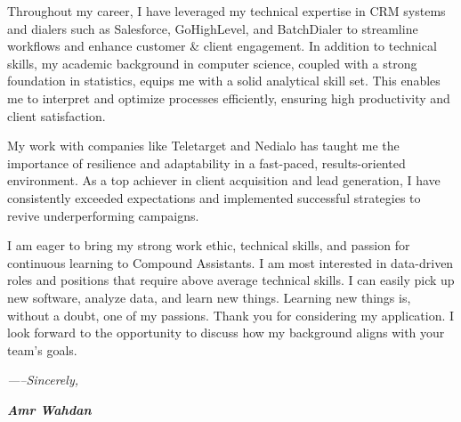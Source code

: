 \documentclass[12pt]{article}
\newcommand{\fancy}[1]{\Large\textbf{\textit{#1}}}
\begin{document}
\vspace{1em}

Throughout my career, I have leveraged my technical expertise in CRM systems and dialers such as Salesforce, GoHighLevel, and BatchDialer to streamline workflows and enhance customer \& client engagement. In addition to technical skills, my academic background in computer science, coupled with a strong foundation in statistics, equips me with a solid analytical skill set. This enables me to interpret and optimize processes efficiently, ensuring high productivity and client satisfaction. \par

\vspace{1em}

My work with companies like Teletarget and Nedialo has taught me the importance of resilience and adaptability in a fast-paced, results-oriented environment. As a top achiever in client acquisition and lead generation, I have consistently exceeded expectations and implemented successful strategies to revive underperforming campaigns. \par

\vspace{1em}

I am eager to bring my strong work ethic, technical skills, and passion for continuous learning to Compound Assistants. I am most interested in data-driven roles and positions that require above average technical skills. I can easily pick up new software, analyze data, and learn new things. Learning new things is, without a doubt, one of my passions. Thank you for considering my application. I look forward to the opportunity to discuss how my background aligns with your team’s goals. \par
 


\vspace{2em}

\textit{-----Sincerely,}

\vspace{1em}

\fancy{Amr Wahdan}
\end{document}
